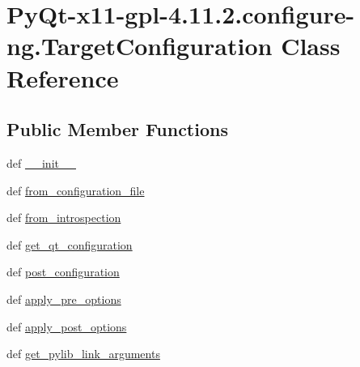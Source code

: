 \hypertarget{classPyQt-x11-gpl-4_811_82_1_1configure-ng_1_1TargetConfiguration}{}\section{Py\+Qt-\/x11-\/gpl-\/4.11.2.configure-\/ng.Target\+Configuration Class Reference}
\label{classPyQt-x11-gpl-4_811_82_1_1configure-ng_1_1TargetConfiguration}
\subsection*{Public Member Functions}
\begin{DoxyCompactItemize}
\item 
def \hyperlink{classPyQt-x11-gpl-4_811_82_1_1configure-ng_1_1TargetConfiguration_a15871b3e2934d095396e007b738a0cce}{\+\_\+\+\_\+init\+\_\+\+\_\+}
\item 
def \hyperlink{classPyQt-x11-gpl-4_811_82_1_1configure-ng_1_1TargetConfiguration_ad3c0024a88652c875c6d12a4aa976ce8}{from\+\_\+configuration\+\_\+file}
\item 
def \hyperlink{classPyQt-x11-gpl-4_811_82_1_1configure-ng_1_1TargetConfiguration_a4bf488e8f8e55689d824a219567358d8}{from\+\_\+introspection}
\item 
def \hyperlink{classPyQt-x11-gpl-4_811_82_1_1configure-ng_1_1TargetConfiguration_ad490a83c732b7c7feead34e0fedccf2b}{get\+\_\+qt\+\_\+configuration}
\item 
def \hyperlink{classPyQt-x11-gpl-4_811_82_1_1configure-ng_1_1TargetConfiguration_adbee03483c378781dbaae04f80481b35}{post\+\_\+configuration}
\item 
def \hyperlink{classPyQt-x11-gpl-4_811_82_1_1configure-ng_1_1TargetConfiguration_ac1d66977fadd586466aab19afcd95901}{apply\+\_\+pre\+\_\+options}
\item 
def \hyperlink{classPyQt-x11-gpl-4_811_82_1_1configure-ng_1_1TargetConfiguration_a58bb780f54d998e3a1484d82bd55a6a2}{apply\+\_\+post\+\_\+options}
\item 
def \hyperlink{classPyQt-x11-gpl-4_811_82_1_1configure-ng_1_1TargetConfiguration_a20aaec48b5d5d5acbaa2542cecd10e9c}{get\+\_\+pylib\+\_\+link\+\_\+arguments}
\end{DoxyCompactItemize}
